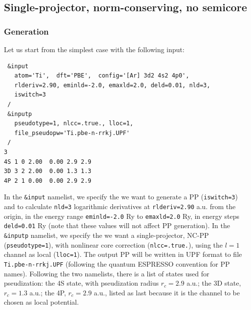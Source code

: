 \documentclass[12pt,a4paper]{article}
\begin{document}
\subsection {Single-projector, norm-conserving, no semicore}

\subsubsection{Generation}
Let us start from the simplest case with the following input:
\begin{verbatim}
 &input
   atom='Ti',  dft='PBE',  config='[Ar] 3d2 4s2 4p0',
   rlderiv=2.90, eminld=-2.0, emaxld=2.0, deld=0.01, nld=3,
   iswitch=3
 /
 &inputp
   pseudotype=1, nlcc=.true., lloc=1,
   file_pseudopw='Ti.pbe-n-rrkj.UPF'
 /
3
4S 1 0 2.00  0.00 2.9 2.9
3D 3 2 2.00  0.00 1.3 1.3
4P 2 1 0.00  0.00 2.9 2.9
\end{verbatim}
In the \texttt{\&input} namelist,
we specify the we want to generate a PP (\texttt{iswitch=3}) and to
calculate \texttt{nld=3} logarithmic derivatives at \texttt{rlderiv=2.90} a.u.
from the origin, in the energy range \texttt{eminld=-2.0} Ry to 
\texttt{emaxld=2.0} Ry, in energy steps \texttt{deld=0.01} Ry
(note that these values will not affect PP generation).
In the \texttt{\&inputp} namelist, we specify the we want a single-projector,
NC-PP (\texttt{pseudotype=1}), with nonlinear core correction 
(\texttt{nlcc=.true.}), using the $l=1$ channel as local (\texttt{lloc=1}).
The output PP will be written in UPF format to file \texttt{Ti.pbe-n-rrkj.UPF}
(following the {\sc quantum ESPRESSO} convention for PP names).
Following the two namelists, there is a list of states used for pseudization:
the 4S state, with pseudization radius $r_c=2.9$ a.u.; the 3D state,
 $r_c=1.3$ a.u.; the 4P, $r_c=2.9$ a.u.,  listed as last because it is
the channel to be chosen as local potential.
\end{document}
